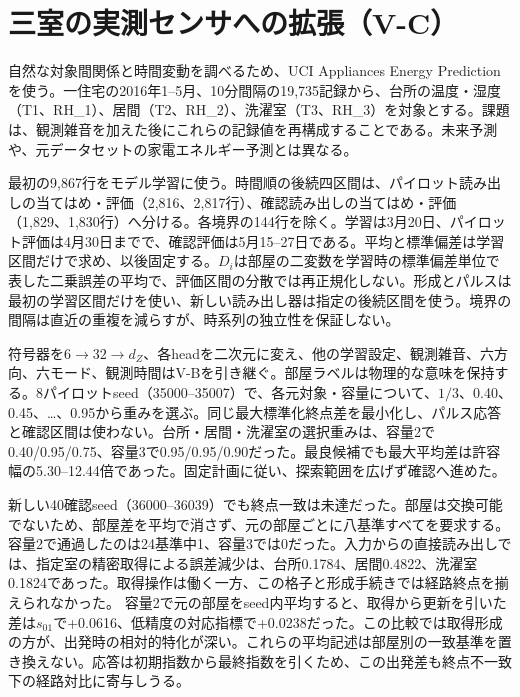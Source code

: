 \section{三室の実測センサへの拡張（V-C）}
\label{app:natural}
自然な対象間関係と時間変動を調べるため、UCI Appliances Energy Predictionを使う\citep{candanedo2017data,candanedo2017dataset}。一住宅の2016年1--5月、10分間隔の19,735記録から、台所の温度・湿度（T1、RH\_1）、居間（T2、RH\_2）、洗濯室（T3、RH\_3）を対象とする。課題は、観測雑音を加えた後にこれらの記録値を再構成することである。未来予測や、元データセットの家電エネルギー予測とは異なる。

最初の9,867行をモデル学習に使う。時間順の後続四区間は、パイロット読み出しの当てはめ・評価（2,816、2,817行）、確認読み出しの当てはめ・評価（1,829、1,830行）へ分ける。各境界の144行を除く。学習は3月20日、パイロット評価は4月30日までで、確認評価は5月15--27日である。平均と標準偏差は学習区間だけで求め、以後固定する。$D_i$は部屋の二変数を学習時の標準偏差単位で表した二乗誤差の平均で、評価区間の分散では再正規化しない。形成とパルスは最初の学習区間だけを使い、新しい読み出し器は指定の後続区間を使う。境界の間隔は直近の重複を減らすが、時系列の独立性を保証しない。

符号器を$6\to32\to d_Z$、各headを二次元に変え、他の学習設定、観測雑音、六方向、六モード、観測時間はV-Bを引き継ぐ。部屋ラベルは物理的な意味を保持する。8パイロットseed（35000--35007）で、各元対象・容量について、$1/3$、0.40、0.45、\ldots、0.95から重みを選ぶ。同じ最大標準化終点差を最小化し、パルス応答と確認区間は使わない。台所・居間・洗濯室の選択重みは、容量2で0.40/0.95/0.75、容量3で0.95/0.95/0.90だった。最良候補でも最大平均差は許容幅の5.30--12.44倍であった。固定計画に従い、探索範囲を広げず確認へ進めた。

新しい40確認seed（36000--36039）でも終点一致は未達だった。部屋は交換可能でないため、部屋差を平均で消さず、元の部屋ごとに八基準すべてを要求する。容量2で通過したのは24基準中1、容量3では0だった。入力からの直接読み出しでは、指定室の精密取得による誤差減少は、台所0.1784、居間0.4822、洗濯室0.1824であった。取得操作は働く一方、この格子と形成手続きでは経路終点を揃えられなかった。 容量2で元の部屋をseed内平均すると、取得から更新を引いた差は$s_{01}$で+0.0616、低精度の対応指標で+0.0238だった。この比較では取得形成の方が、出発時の相対的特化が深い。これらの平均記述は部屋別の一致基準を置き換えない。応答は初期指数から最終指数を引くため、この出発差も終点不一致下の経路対比に寄与しうる。


